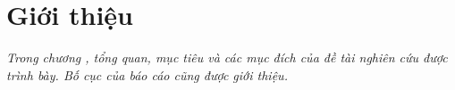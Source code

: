 \chapter{Giới thiệu}
\vspace{-1cm}
\textit{Trong chương \thechapter, tổng quan, mục tiêu và các mục đích của đề tài nghiên cứu được trình bày. Bố cục của báo cáo cũng được giới thiệu.}
\vspace{0.2cm}

% 



